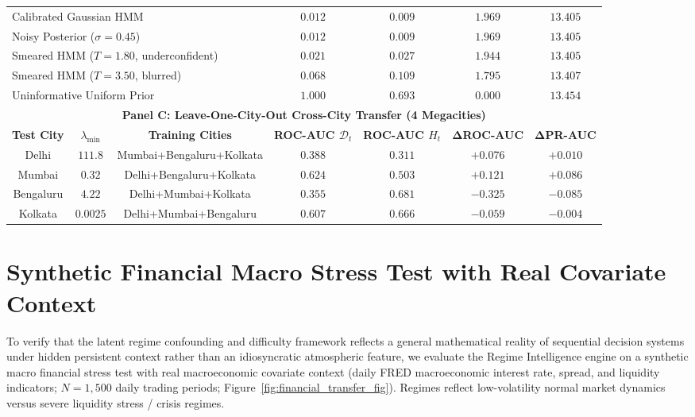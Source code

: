 \documentclass[twoside]{article}
\theoremstyle{definition}
\begin{document}
\begin{table}[!ht]
{\begin{tabular}{ccccccc}
\multicolumn{3}{l}{Calibrated Gaussian HMM} & $0.012$ & $0.009$ & $1.969$ & $13.405$ \\
\multicolumn{3}{l}{Noisy Posterior ($\sigma=0.45$)} & $0.012$ & $0.009$ & $1.969$ & $13.405$ \\
\multicolumn{3}{l}{Smeared HMM ($T=1.80$, underconfident)} & $0.021$ & $0.027$ & $1.944$ & $13.405$ \\
\multicolumn{3}{l}{Smeared HMM ($T=3.50$, blurred)} & $0.068$ & $0.109$ & $1.795$ & $13.407$ \\
\multicolumn{3}{l}{Uninformative Uniform Prior} & $1.000$ & $0.693$ & $0.000$ & $13.454$ \\
\midrule
\multicolumn{7}{c}{\textbf{Panel C: Leave-One-City-Out Cross-City Transfer (4 Megacities)}} \\
\textbf{Test City} & $\lambda_{\min}$ & \textbf{Training Cities} & \textbf{ROC-AUC $\mathcal{D}_t$} & \textbf{ROC-AUC $H_t$} & $\boldsymbol{\Delta}$\textbf{ROC-AUC} & $\boldsymbol{\Delta}$\textbf{PR-AUC} \\
\midrule
Delhi & $111.8$ & Mumbai+Bengaluru+Kolkata & $0.388$ & $0.311$ & $\mathbf{+0.076}$ & $+0.010$ \\
Mumbai & $0.32$ & Delhi+Bengaluru+Kolkata & $0.624$ & $0.503$ & $\mathbf{+0.121}$ & $+0.086$ \\
Bengaluru & $4.22$ & Delhi+Mumbai+Kolkata & $0.355$ & $0.681$ & $-0.325$ & $-0.085$ \\
Kolkata & $0.0025$ & Delhi+Mumbai+Bengaluru & $0.607$ & $0.666$ & $-0.059$ & $-0.004$ \\
\bottomrule
\end{tabular}%
}
\end{table}


\vspace{-3mm}
\section{Synthetic Financial Macro Stress Test with Real Covariate Context}
\label{app:financial_transfer}
To verify that the latent regime confounding and difficulty framework reflects a general mathematical reality of sequential decision systems under hidden persistent context rather than an idiosyncratic atmospheric feature, we evaluate the Regime Intelligence engine on a synthetic macro financial stress test with real macroeconomic covariate context (daily FRED macroeconomic interest rate, spread, and liquidity indicators; $N=1,500$ daily trading periods; Figure~\ref{fig:financial_transfer_fig}). Regimes reflect low-volatility normal market dynamics versus severe liquidity stress / crisis regimes.
\end{document}
